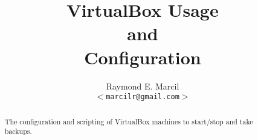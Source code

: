 \documentclass[12pt,letterpaper,dvips]{article}
\title{VirtualBox Usage\\
  and\\
  Configuration}
\author{Raymond E. Marcil\\
        \texttt{$<$marcilr@gmail.com$>$}
}
\begin{document}
\maketitle

\begin{abstract}
  The configuration and scripting of VirtualBox
  machines to start/stop and take backups.
\end{abstract}

\vspace{2.0in}


\newpage
\tableofcontents

\newpage
\listoffigures
\listoftables










\end{document}

